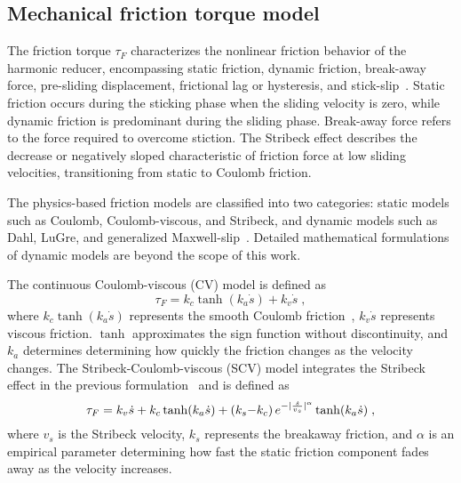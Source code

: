 \subsection{Mechanical friction torque model}
\label{sec:cv_scv}
The friction torque $\tau_F$ characterizes the nonlinear friction behavior of the harmonic reducer, encompassing static friction, dynamic friction, break-away force, pre-sliding displacement, frictional lag or hysteresis, and stick-slip~\cite{marques2016survey}. Static friction occurs during the sticking phase when the sliding velocity is zero, while dynamic friction is predominant during the sliding phase. Break-away force refers to the force required to overcome stiction. The Stribeck effect describes the decrease or negatively sloped characteristic of friction force at low sliding velocities, transitioning from static to Coulomb friction.

The physics-based friction models are classified into two categories: static models such as Coulomb, Coulomb-viscous, and Stribeck, and dynamic models such as Dahl, LuGre, and generalized Maxwell-slip~\cite{olsson1998friction}. Detailed mathematical formulations of dynamic models are beyond the scope of this work.

The continuous Coulomb-viscous (CV) model is defined as
\begin{equation}
\label{eq:cv}
    \tau_F = k_c \tanh(k_a \dot{s}) + k_v \dot{s} \; ,
\end{equation}
where $k_c \tanh(k_a \dot{s})$ represents the smooth Coulomb friction~\cite{pennestri2016review}, $k_v \dot{s}$ represents viscous friction. $\tanh$ approximates the sign function without discontinuity, and $k_a$ determines determining how quickly the friction changes as the velocity changes.
The Stribeck-Coulomb-viscous (SCV) model integrates the Stribeck effect in the previous formulation~\cite{olsson1998friction} and is defined as
\begin{equation}
\label{eq:scv}
    \tau_F = k_v \dot{s} + k_c \operatorname{tanh}(k_a \dot{s}) + \left( k_s {-} k_c  \right) e^{-\lvert\frac{\dot{s}}{v_s}\rvert^\alpha} \operatorname{tanh}(k_a \dot{s}) \; ,
\end{equation}
where $v_s$ is the Stribeck velocity, $k_s$ represents the breakaway friction, and $\alpha$ is an empirical parameter determining how fast the static friction component fades away as the velocity increases.

